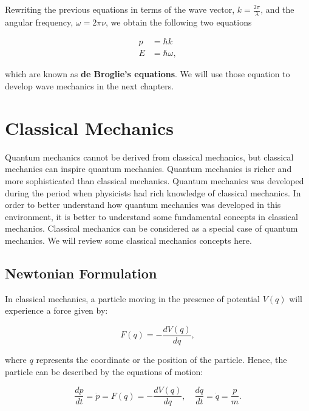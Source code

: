 \documentclass[
  9pt,
]{extbook}
\theoremstyle{definition}
\theoremstyle{definition}
\theoremstyle{definition}
\theoremstyle{remark}
\begin{document}
Rewriting the previous equations in terms of the wave vector, \(k=\frac{2\pi}{\lambda}\), and the angular frequency, \(\omega=2\pi\nu\), we obtain the following two equations

\begin{equation}
\begin{aligned}
p &= \hbar k \\
E &= \hbar \omega,
\end{aligned}
\label{eq:wp1b}
\end{equation}

which are known as \textbf{de Broglie's equations}. We will use those equation to develop wave mechanics in the next chapters.

\hypertarget{Classical}{%
\chapter{Classical Mechanics}\label{Classical}}

Quantum mechanics cannot be derived from classical mechanics, but classical mechanics can inspire quantum mechanics. Quantum mechanics is richer and more sophisticated than classical mechanics. Quantum mechanics was developed during the period when physicists had rich knowledge of classical mechanics. In order to better understand how quantum mechanics was developed in this environment, it is better to understand some fundamental concepts in classical mechanics. Classical mechanics can be considered as a special case of quantum mechanics. We will review some classical mechanics concepts here.

\hypertarget{newtonian-formulation}{%
\section{Newtonian Formulation}\label{newtonian-formulation}}

In classical mechanics, a particle moving in the presence of potential \(V(q)\) will experience a force given by:

\begin{equation}
F(q) = -\frac{dV(q)}{dq},
\label{eq:class1}
\end{equation}

where \(q\) represents the coordinate or the position of the particle. Hence, the particle can be described by the equations of motion:

\begin{equation}
\frac{dp}{dt} = \dot{p} = F(q) = -\frac{dV (q)}{dq},\quad \frac{dq}{dt} =\dot{q}= \frac{p}{m}.
\label{eq:class2}
\end{equation}
\end{document}
